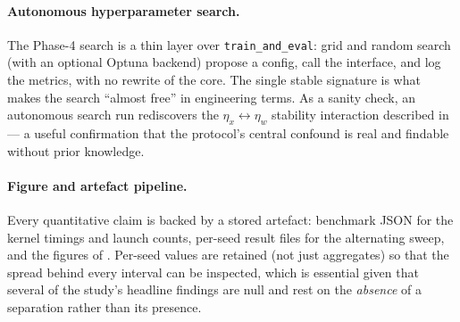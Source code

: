\paragraph{Autonomous hyperparameter search.} The Phase-4 search is a thin layer over
\texttt{train\_and\_eval}: grid and random search (with an optional Optuna backend) propose a config,
call the interface, and log the metrics, with no rewrite of the core. The single stable signature is
what makes the search ``almost free'' in engineering terms. As a sanity check, an autonomous search run
rediscovers the $\eta_x \leftrightarrow \eta_w$ stability interaction described in
 --- a useful confirmation that the protocol's central confound is real and findable
without prior knowledge.

\paragraph{Figure and artefact pipeline.} Every quantitative claim is backed by a stored artefact:
benchmark JSON for the kernel timings and launch counts, per-seed result files for the alternating
sweep, and the figures of . Per-seed values are retained (not just aggregates) so
that the spread behind every interval can be inspected, which is essential given that several of the
study's headline findings are null and rest on the \emph{absence} of a separation rather than its
presence.

